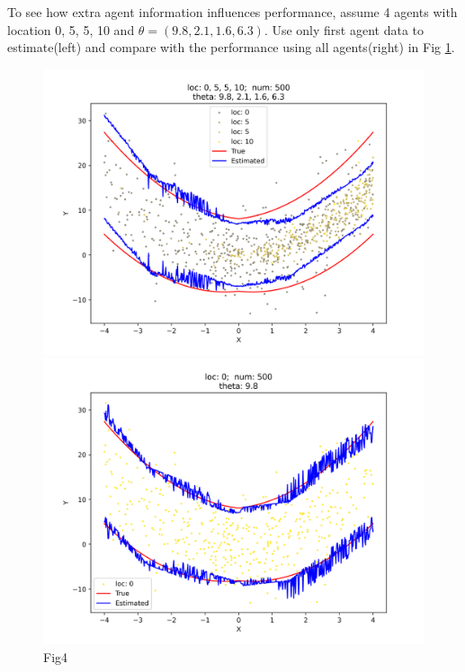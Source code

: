 \documentclass[12pt, a4paper, oneside]{article}
\begin{document}
    To see how extra agent information influences performance, assume 4 agents with location 0, 5, 5, 10 and $\theta=(9.8, 2.1, 1.6, 6.3)$. Use only first agent data to estimate(left) and compare with the performance using all agents(right) in Fig \ref{Fig4}.
    \begin{figure}[htbp]
        \centering
        \begin{minipage}{0.495\linewidth}
            \centering
            \includegraphics[width=0.98\linewidth]{fig/Ex1_2/0_5_5_10.png}
        \end{minipage}
        \begin{minipage}{0.495\linewidth}
            \centering
            \includegraphics[width=0.98\linewidth]{fig/Ex1_2/0.png}
        \end{minipage}
        \caption{Fig4}
        \label{Fig4}
    \end{figure}
\end{document}
